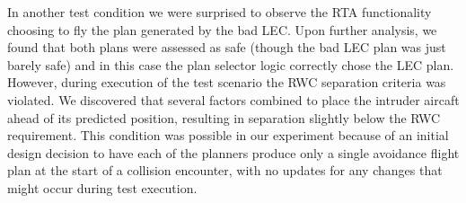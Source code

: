 In another test condition we were surprised to observe the RTA functionality choosing to fly the plan generated by the bad LEC.  Upon further analysis, we found that both plans were assessed as safe (though the bad LEC plan was just barely safe) and in this case the plan selector logic correctly chose the LEC plan.  However, during execution of the test scenario the RWC separation criteria was violated.  We discovered that several factors combined to place the intruder aircaft ahead of its predicted position, resulting in separation slightly below the RWC requirement.  This condition was possible in our experiment because of an initial design decision to have each of the planners produce only a single avoidance flight plan at the start of a collision encounter, with no updates for any changes that might occur during test execution.  




